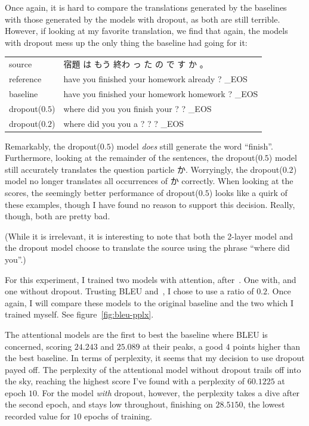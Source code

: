 \documentclass[answers]{exam}
\begin{document}
\begin{CJK}{UTF8}{min}
\begin{questions}
\begin{framed}
  Once again, it is hard to compare the translations generated by the baselines
  with those generated by the models with dropout, as both are still terrible.
  However, if looking at my favorite translation, we find that again, the models
  with dropout mess up the only thing the baseline had going for it:

  \begin{tabular}{ll}
    source         & 宿題 は もう 終わ っ た の で す か 。\\
    reference      & have you finished your homework already ? \_EOS  \\
    baseline       & have you finished your homework homework ? \_EOS \\
    dropout($0.5$) & where did you you finish your ? ? \_EOS \\
    dropout($0.2$) & where did you you a ? ? ? \_EOS
  \end{tabular}

  Remarkably, the dropout($0.5$) model \emph{does} still generate the word
  ``finish''. Furthermore, looking at the remainder of the sentences, the
  dropout($0.5$) model still accurately translates the question particle か.
  Worryingly, the dropout($0.2$) model no longer translates all occurrences of
  か correctly. When looking at the scores, the seemingly better performance of
  dropout($0.5$) looks like a quirk of these examples, though I have found no
  reason to support this decision. Really, though, both are pretty bad.

  (While it is irrelevant, it is interesting to note that both the 2-layer model
  and the dropout model choose to translate the source using the phrase ``where
  did you''.) 
\end{framed}



\begin{framed}
  For this experiment, I trained two models with attention,
  after~\citet{Luong-2015}. One with, and one without dropout. Trusting BLEU
  and~\citet{Zaremba-2014}, I chose to use a ratio of $0.2$. Once again, I will
  compare these models to the original baseline and the two which I trained
  myself. See figure~\ref{fig:bleu-pplx}. 

  The attentional models are the first to best the baseline where BLEU is
  concerned, scoring $24.243$ and $25.089$ at their peaks, a good $4$ points
  higher than the best baseline. In terms of perplexity, it seems that my
  decision to use dropout payed off. The perplexity of the attentional model
  without dropout trails off into the sky, reaching the highest score I've found
  with a perplexity of $60.1225$ at epoch $10$. For the model \emph{with}
  dropout, however, the perplexity takes a dive after the second epoch, and
  stays low throughout, finishing on $28.5150$, the lowest recorded value for
  $10$ epochs of training.


\end{framed}
\end{questions}
\end{CJK}
\end{document}
